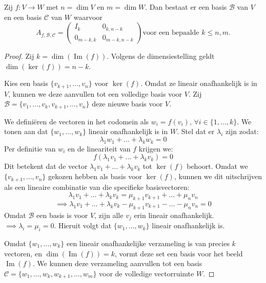 \begin{stelling}[4.2.8]
    Zij $f \colon V \to W$ met $n = \dim V$ en $m = \dim W$. Dan bestaat er een basis $\mathcal{B}$ van $V$ en een basis $\mathcal{C}$ van $W$ waarvoor
    \[ A_{f,\mathcal{B},\mathcal{C}} = \left(\begin{array}{c|c}
        I_k & 0_{k,n-k} \\ \hline
        0_{m-k,k} & 0_{m-k,n-k}
    \end{array}\right) \text{voor een bepaalde } k \le n, m. \]
\end{stelling}
\begin{proof}
    Zij $k = \dim(\operatorname{Im}(f))$. Volgens de dimensiestelling geldt $\dim(\ker(f)) = n - k$.

    Kies een basis $\{v_{k+1}, \dots, v_n\}$ voor $\ker(f)$. Omdat ze lineair onafhankelijk is in $V$, kunnen we deze aanvullen tot een volledige basis voor $V$.
    Zij $\mathcal{B} = \{v_1, \dots, v_k, v_{k+1}, \dots, v_n\}$ deze nieuwe basis voor $V$.

    We definiëren de vectoren in het codomein als $w_i = f(v_i), \, \forall i \in \{ 1, \dots, k\}$.
    We tonen aan dat $\{w_1, \dots, w_k\}$ lineair onafhankelijk is in $W$.
    Stel dat er $\lambda_i$ zijn zodat:
    $$\lambda_1 w_1 + \dots + \lambda_k w_k = 0$$
    Per definitie van $w_i$ en de lineariteit van $f$ krijgen we:
    $$f(\lambda_1 v_1 + \dots + \lambda_k v_k) = 0$$
    Dit betekent dat de vector $\lambda_1 v_1 + \dots + \lambda_k v_k$ tot $\ker(f)$ behoort. Omdat we $\{v_{k+1}, \dots, v_n\}$ gekozen hebben als basis voor $\ker(f)$, kunnen we dit uitschrijven als een lineaire combinatie van die specifieke basisvectoren:
    $$\lambda_1 v_1 + \dots + \lambda_k v_k = \mu_{k+1} v_{k+1} + \dots + \mu_n v_n$$
    $$\implies\lambda_1 v_1 + \dots + \lambda_k v_k - \mu_{k+1} v_{k+1} - \dots - \mu_n v_n = 0$$
    Omdat $\mathcal{B}$ een basis is voor $V$, zijn alle $v_j$ erin lineair onafhankelijk. \(\implies \lambda_i = \mu_i = 0\).  Hieruit volgt dat $\{w_1, \dots, w_k\}$ lineair onafhankelijk is.

    Omdat $\{w_1, \dots, w_k\}$ een lineair onafhankelijke verzameling is van precies $k$ vectoren, en $\dim(\operatorname{Im}(f)) = k$, vormt deze set een basis voor het beeld $\operatorname{Im}(f)$.
    We kunnen deze verzameling aanvullen tot een basis $\mathcal{C} = \{w_1, \dots, w_k, w_{k+1}, \dots, w_m\}$ voor de volledige vectorruimte $W$.


\end{proof}
